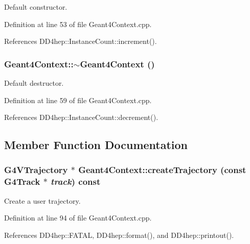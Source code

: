 Default constructor. 

Definition at line 53 of file Geant4Context.cpp.

References DD4hep::InstanceCount::increment().\hypertarget{class_d_d4hep_1_1_simulation_1_1_geant4_context_a2749e0729fa01575c3bac14918cca3c8}{
\subsubsection[{$\sim$Geant4Context}]{\setlength{\rightskip}{0pt plus 5cm}Geant4Context::$\sim$Geant4Context ()}}
\label{class_d_d4hep_1_1_simulation_1_1_geant4_context_a2749e0729fa01575c3bac14918cca3c8}


Default destructor. 

Definition at line 59 of file Geant4Context.cpp.

References DD4hep::InstanceCount::decrement().

\subsection{Member Function Documentation}
\hypertarget{class_d_d4hep_1_1_simulation_1_1_geant4_context_a1fba0133b5ff85fe0b1356b8d5b14b9a}{
\subsubsection[{createTrajectory}]{\setlength{\rightskip}{0pt plus 5cm}G4VTrajectory $\ast$ Geant4Context::createTrajectory (const G4Track $\ast$ {\em track}) const}}
\label{class_d_d4hep_1_1_simulation_1_1_geant4_context_a1fba0133b5ff85fe0b1356b8d5b14b9a}


Create a user trajectory. 

Definition at line 94 of file Geant4Context.cpp.

References DD4hep::FATAL, DD4hep::format(), and DD4hep::printout().

